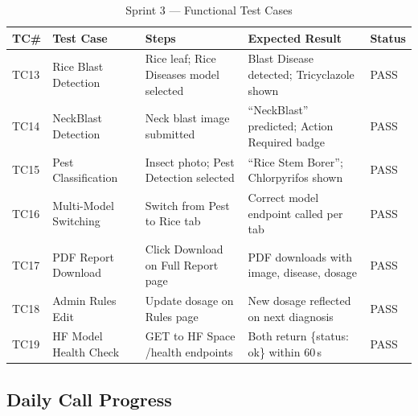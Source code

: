 \documentclass[12pt,a4paper]{report}
\begin{document}
\begin{table}[H]
\centering
\caption{Sprint 3 --- Functional Test Cases}
\label{tab:sprint3_tc}
\renewcommand{\arraystretch}{1.4}
\begin{tabular}{|p{0.9cm}|p{2.8cm}|p{4.2cm}|p{4cm}|p{1.4cm}|}
\hline
\textbf{TC\#} & \textbf{Test Case} & \textbf{Steps} & \textbf{Expected Result} & \textbf{Status} \\
\hline
TC13 & Rice Blast Detection & Rice leaf; Rice Diseases model selected & Blast Disease detected; Tricyclazole shown & PASS \\
\hline
TC14 & NeckBlast Detection & Neck blast image submitted & ``NeckBlast'' predicted; Action Required badge & PASS \\
\hline
TC15 & Pest Classification & Insect photo; Pest Detection selected & ``Rice Stem Borer''; Chlorpyrifos shown & PASS \\
\hline
TC16 & Multi-Model Switching & Switch from Pest to Rice tab & Correct model endpoint called per tab & PASS \\
\hline
TC17 & PDF Report Download & Click Download on Full Report page & PDF downloads with image, disease, dosage & PASS \\
\hline
TC18 & Admin Rules Edit & Update dosage on Rules page & New dosage reflected on next diagnosis & PASS \\
\hline
TC19 & HF Model Health Check & GET to HF Space /health endpoints & Both return \{status: ok\} within 60\,s & PASS \\
\hline
\end{tabular}
\end{table}

\subsection{Daily Call Progress}
\end{document}
